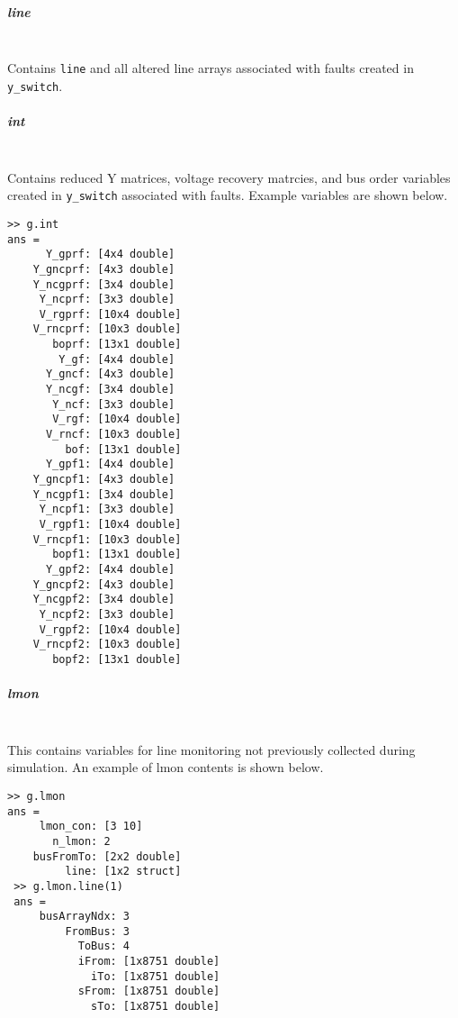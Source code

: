 \documentclass[12pt]{article}
\begin{document}
\subparagraph{line} \ \\
Contains \verb|line| and all altered line arrays associated with faults created in \verb|y_switch|.

\subparagraph{int} \ \\
Contains reduced Y matrices, voltage recovery matrcies, and bus order variables created in \verb|y_switch| associated with faults.
Example variables are shown below.
\begin{verbatim}
>> g.int
ans = 
      Y_gprf: [4x4 double]
    Y_gncprf: [4x3 double]
    Y_ncgprf: [3x4 double]
     Y_ncprf: [3x3 double]
     V_rgprf: [10x4 double]
    V_rncprf: [10x3 double]
       boprf: [13x1 double]
        Y_gf: [4x4 double]
      Y_gncf: [4x3 double]
      Y_ncgf: [3x4 double]
       Y_ncf: [3x3 double]
       V_rgf: [10x4 double]
      V_rncf: [10x3 double]
         bof: [13x1 double]
      Y_gpf1: [4x4 double]
    Y_gncpf1: [4x3 double]
    Y_ncgpf1: [3x4 double]
     Y_ncpf1: [3x3 double]
     V_rgpf1: [10x4 double]
    V_rncpf1: [10x3 double]
       bopf1: [13x1 double]
      Y_gpf2: [4x4 double]
    Y_gncpf2: [4x3 double]
    Y_ncgpf2: [3x4 double]
     Y_ncpf2: [3x3 double]
     V_rgpf2: [10x4 double]
    V_rncpf2: [10x3 double]
       bopf2: [13x1 double]
\end{verbatim}
\subparagraph{lmon} \ \\
This contains variables for line monitoring not previously collected during simulation.
An example of lmon contents is shown below.
\begin{verbatim}
>> g.lmon
ans = 
     lmon_con: [3 10]
       n_lmon: 2
    busFromTo: [2x2 double]
         line: [1x2 struct]
 >> g.lmon.line(1)
 ans = 
     busArrayNdx: 3
         FromBus: 3
           ToBus: 4
           iFrom: [1x8751 double]
             iTo: [1x8751 double]
           sFrom: [1x8751 double]
             sTo: [1x8751 double]
\end{verbatim}
\end{document}
